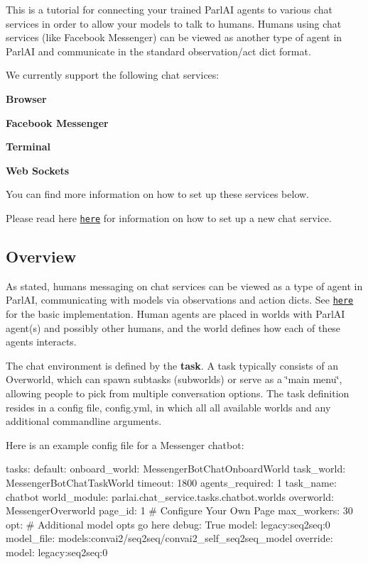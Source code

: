 This is a tutorial for connecting your trained Parl\+AI agents to various chat services in order to allow your models to talk to humans. Humans using chat services (like Facebook Messenger) can be viewed as another type of agent in Parl\+AI and communicate in the standard observation/act dict format.

We currently support the following chat services\+:


\begin{DoxyEnumerate}
\item {\bfseries Browser}
\item {\bfseries Facebook Messenger}
\item {\bfseries Terminal}
\item {\bfseries Web Sockets}
\end{DoxyEnumerate}

You can find more information on how to set up these services below.

Please read here \href{https://github.com/facebookresearch/ParlAI/tree/master/parlai/chat_service}{\tt here} for information on how to set up a new chat service.

\subsection*{Overview}

As stated, humans messaging on chat services can be viewed as a type of agent in Parl\+AI, communicating with models via observations and action dicts. See \href{https://github.com/facebookresearch/ParlAI/blob/master/parlai/chat_service/core/agents.py}{\tt here} for the basic implementation. Human agents are placed in worlds with Parl\+AI agent(s) and possibly other humans, and the world defines how each of these agents interacts.

The chat environment is defined by the {\bfseries task}. A task typically consists of an {\ttfamily Overworld}, which can spawn subtasks (subworlds) or serve as a \char`\"{}main menu\char`\"{}, allowing people to pick from multiple conversation options. The task definition resides in a config file, {\ttfamily config.\+yml}, in which all all available worlds and any additional commandline arguments.

Here is an example config file for a Messenger chatbot\+:


\begin{DoxyCode}
tasks:
  default:
    onboard\_world: MessengerBotChatOnboardWorld
    task\_world: MessengerBotChatTaskWorld
    timeout: 1800
    agents\_required: 1
task\_name: chatbot
world\_module: parlai.chat\_service.tasks.chatbot.worlds
overworld: MessengerOverworld
page\_id: 1 # Configure Your Own Page
max\_workers: 30
opt:  # Additional model opts go here
  debug: True
  model: legacy:seq2seq:0
  model\_file: models:convai2/seq2seq/convai2\_self\_seq2seq\_model
  override:
    model: legacy:seq2seq:0
\end{DoxyCode}


